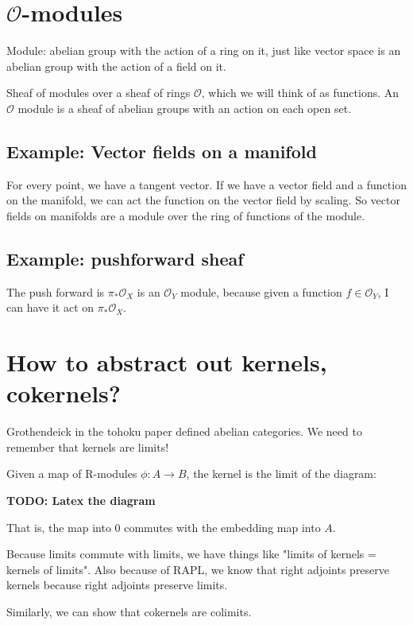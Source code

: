 \documentclass{book}
\renewcommand{\O}{\ensuremath{\mathcal{O}}}
\theoremstyle{definition}
\begin{document}
\section{$\O$-modules}
Module: abelian group with the action of a ring on it, just like vector space
is an abelian group with the action of a field on it.


Sheaf of modules over a sheaf of rings $\O$, which we will think of
as functions. An $\O$ module is a sheaf of abelian groups 
with an action on each open set.

\subsection{Example: Vector fields on a manifold}
For every point, we have a tangent vector. If we have a vector field and a
function on the manifold, we can act the function on the vector field by scaling.
So vector fields on manifolds are a module over the ring of functions of the module.

\subsection{Example: pushforward sheaf}
The push forward is $\pi_* \O_X$ is an $\O_Y$ module, because
given a function $f \in \O_Y$, I can have it act on $\pi_* \O_X$.

\section{How to abstract out kernels, cokernels?}
Grothendeick in the tohoku paper defined abelian categories. We need to remember
that kernels are limits!

Given a map of R-modules $\phi: A \rightarrow B$, the kernel is the limit of
the diagram:


\textbf{TODO: Latex the diagram}

That is, the map into $0$ commutes with the embedding map into $A$. 

Because limits commute with limits, we have things like "limits of kernels = kernels of limits".
Also because of RAPL, we know that right adjoints preserve kernels because
right adjoints preserve limits.

Similarly, we can show that cokernels are colimits.
\end{document}
